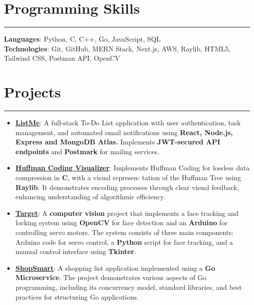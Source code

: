 \documentclass[a4paper,10.5pt]{article}  %
\begin{document}
\section*{Programming Skills}
\vspace{-.3em}
\hrule
\vspace{0.4em}

\textbf{Languages}: Python, C, C++, Go, JavaScript, SQL \vspace{0.3em} \\
\textbf{Technologies}: Git, GitHub, MERN Stack, Next.js, AWS, Raylib, HTML5, Tailwind CSS, Postman API, OpenCV
\vspace{-.3em}

\section*{Projects}
\vspace{-.3em}
\hrule
\vspace{0.4em}

\begin{itemize}
    \item \textbf{\href{https://github.com/thearfa99/mern}{\underline{ListMe}}}: A full-stack To-Do List application with user authentication, task management, and automated email notifications using \textbf{React, Node.js, Express and MongoDB Atlas.} Implements \textbf{JWT-secured API endpoints} and \textbf{Postmark} for mailing services.
    \item \textbf{\href{https://github.com/thearfa99/huft}{\underline{Huffman Coding Visualizer}}}: Implements Huffman Coding for lossless data compression in \textbf{C}, with a visual represen- tation of the Huffman Tree using \textbf{Raylib}. It demonstrates encoding processes through clear visual feedback, enhancing understanding of algorithmic efficiency.
    \item \textbf{\href{https://github.com/thearfa99/tureet}{\underline{Target}}}: A \textbf{computer vision} project that implements a face tracking and locking system using \textbf{OpenCV} for face detection and an \textbf{Arduino} for controlling servo motors. The system consists of three main components: Arduino code for servo control, a \textbf{Python} script for face tracking, and a manual control interface using \textbf{Tkinter}.
    \item \textbf{\href{https://github.com/thearfa99/ShopSmart}{\underline{ShopSmart}}}: A shopping list application implemented using a \textbf{Go Microservice}. The project demonstrates various aspects of Go programming, including its concurrency model, standard libraries, and best practices for structuring Go applications.
\end{itemize}
\end{document}
